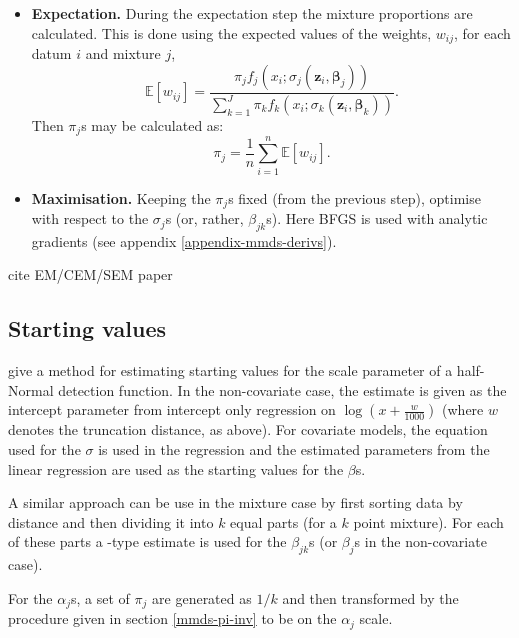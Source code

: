 \begin{itemize}
\item \textbf{Expectation.}
During the expectation step the mixture proportions are calculated. This is done using the expected values of the weights, $w_{ij}$, for each datum $i$ and mixture $j$,
\begin{equation*}
\mathbb{E}[w_{ij}] = \frac{\pi_j f_j(x_i;\sigma_j(\bm{z}_i,\bm{\beta}_j))}{\sum_{k=1}^J \pi_k f_k(x_i;\sigma_k(\bm{z}_i,\bm{\beta}_k))}.
\end{equation*}
Then $\pi_j$s may be calculated as:
\begin{equation*}
\pi_j=\frac{1}{n} \sum_{i=1}^n \mathbb{E}[w_{ij}].
\end{equation*}

\item \textbf{Maximisation.}
Keeping the $\pi_j$s fixed (from the previous step), optimise with respect to the $\sigma_j$s (or, rather, $\beta_{jk}$s). Here BFGS is used with analytic gradients (see appendix \ref{appendix-mmds-derivs}). 
\end{itemize}



cite EM/CEM/SEM paper



\subsection{Starting values}
\label{mmds-starting-vals}
\cite{beavers98} give a method for estimating starting values for the scale parameter of a half-Normal detection function. In the non-covariate case, the estimate is given as the intercept parameter from intercept only regression on $\log(x+\frac{w}{1000})$ (where $w$ denotes the truncation distance, as above). For covariate models, the equation used for the $\sigma$ is used in the regression and the estimated parameters from the linear regression are used as the starting values for the $\beta$s.

A similar approach can be use in the mixture case by first sorting data by distance and then dividing it into $k$ equal parts (for a $k$ point mixture). For each of these parts a \cite{beavers98}-type estimate is used for the $\beta_{jk}$s (or $\beta_j$s in the non-covariate case).

For the $\alpha_j$s, a set of $\pi_j$ are generated as $1/k$ and then transformed by the procedure given in section \ref{mmds-pi-inv} to be on the $\alpha_j$ scale.


